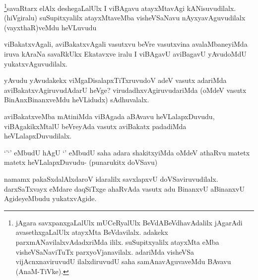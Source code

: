 
\begin{artha}
\footnote{jAgara savxpanxgaLalUlx mUCeRyalUlx BeVdABeVdhavAdalilx jAgarAdi avasethxgaLalUlx atayxMta BeVdavilalx. adakekx parxmANavilalxvAdadxriMda ililx. suSupitxyalilx atayxMta eMba visheVSaNaviTuTx parxyoVjanavilalx. adariMda visheVSa vijAcnxnaviruvudU ilalxdiruvudU saha samAnavAguvaveMdu BAvavu (AnaM-TiVke).}savaRtarx elAlx deshegaLalUlx I viBAgavu atayxMtavAgi kANisuvudilalx. (hiVgiralu) suSupitxyalilx atayxMtaveMba visheVSaNavu nAyxyavAguvudilalx (vayxthaR)veMdu heVLuvudu
\end{artha}


\begin{artha}
viBakatxvAgali, aviBakatxvAgali vasutxvu beVre vasutxvina avalaMbaneyiMda iruva kAraNa savaRkUkx Ekatavxve iralu I viBAgavU aviBagavU yAvudoMdU yukatxvAguvudilalx.
\end{artha}

\begin{artha}
yAvudu yAvudakekx viMgaDisalapxTiTxruvudoV adeV vasutx adariMda aviBakatxvAgiruvudAdarU heVge? virudadhxvAgiruvudariMda (oMdeV vasutx BinAnxBinanxveMdu heVLidudx) sAdhuvalalx.
\end{artha}

\begin{artha}
aviBakatxveMba mAtiniMda viBAgada aBAvavu heVLalapxDuvudu, viBAgakikxMtalU beVreyAda vasutx aviBakatx padadiMda heVLalapxDuvudilalx.
\end{artha}


\begin{artha}
`\stext'`\stext' eMbudU hAgU `\stext' eMbudU saha adara shakitxyiMda oMdeV athaRvu matetx matetx heVLalapxDuvudu- (punarukitx doVSavu)
\end{artha}


\begin{artha}
namamx pakaSxdalAlxdaroV idaralilx savxlapxvU doVSaviruvudilalx. darxSaTxvayx eMdare daqSiTxge ahaRvAda vasutx adu BinanxvU aBinanxvU AgideyeMbudu yukatxvAgide.
\end{artha}


